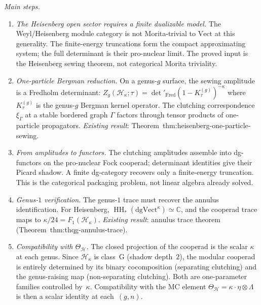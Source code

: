 \documentclass[11pt]{article}
\newcommand{\cH}{\mathcal{H}}
\newcommand{\C}{\mathbb{C}}
\newcommand{\HH}{\operatorname{HH}}
\begin{document}
\noindent\emph{Main steps.}
\begin{enumerate}[label=\textup{Step~\arabic*.},leftmargin=4em]
\item \emph{The Heisenberg open sector requires a finite
  dualizable model.}  The Weyl/Heisenberg module category is not
  Morita-trivial to $\mathrm{Vect}$ at this generality.  The
  finite-energy truncations form the compact approximating system;
  the full determinant is their pro-nuclear limit.  The proved
  input is the Heisenberg sewing theorem, not categorical Morita
  triviality.

\item \emph{One-particle Bergman reduction.}  On a genus-$g$
  surface, the sewing amplitude is a Fredholm determinant:
  $Z_g(\cH_\kappa; \tau) = \det'_{\mathrm{Fred}}
  (1 - K_\tau^{(g)})^{-\kappa}$
  where $K_\tau^{(g)}$ is the genus-$g$ Bergman kernel operator.
  The clutching correspondence $\xi_\Gamma$ at a stable
  bordered graph $\Gamma$ factors through tensor products of
  one-particle propagators.
  \emph{Existing result}: Theorem~\textup{thm:heisenberg-one-particle-sewing}.

\item \emph{From amplitudes to functors.}  The clutching
  amplitudes assemble into dg-functors on the pro-nuclear Fock
  cooperad; determinant identities give their Picard shadow.
  A finite dg-category recovers only a finite-energy truncation.
  This is the categorical packaging
  problem, not linear algebra already solved.

\item \emph{Genus-$1$ verification.}  The genus-$1$ trace
  must recover the annulus identification.  For Heisenberg,
  $\HH_*(\mathrm{dgVect}^{\kappa}) \simeq \C$, and the
  cooperad trace maps to $\kappa/24 = F_1(\cH_\kappa)$.
  \emph{Existing result}: annulus trace theorem
  (Theorem~\textup{thm:thqg-annulus-trace}).

\item \emph{Compatibility with $\Theta_{\cH}$.}  The closed
  projection of the cooperad is the scalar $\kappa$ at each
  genus.  Since $\cH_\kappa$ is class~G (shadow depth~$2$),
  the modular cooperad is entirely determined by its binary
  cocomposition (separating clutching) and the genus-raising
  map (non-separating clutching).  Both are one-parameter
  families controlled by~$\kappa$.  Compatibility with the
  MC element $\Theta_{\cH} = \kappa \cdot \eta \otimes \Lambda$
  is then a scalar identity at each~$(g,n)$.
\end{enumerate}
\end{document}
